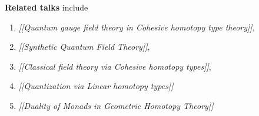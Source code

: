 \documentclass[12pt,titlepage]{article}
\theoremstyle{plain}
\theoremstyle{definition}
\theoremstyle{remark}
\begin{document}
$\,$

\textbf{Related talks} include

\begin{enumerate}%
\item \emph{[[Quantum gauge field theory in Cohesive homotopy type theory]]},


\item \emph{[[Synthetic Quantum Field Theory]]},


\item \emph{[[Classical field theory via Cohesive homotopy types]]},


\item \emph{[[Quantization via Linear homotopy types]]}


\item \emph{[[Duality of Monads in Geometric Homotopy Theory]]}



\end{enumerate}
\end{document}
